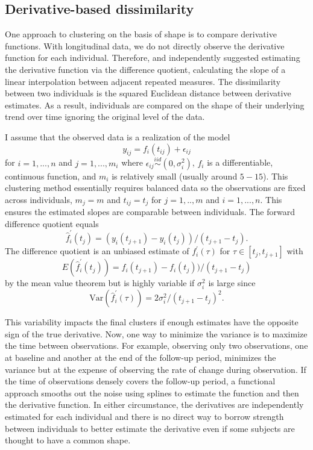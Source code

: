 \subsection{Derivative-based dissimilarity}
One approach to clustering on the basis of shape is to compare derivative functions. With longitudinal data, we do not directly observe the derivative function for each individual. Therefore, \textcite{moller2003} and \textcite{d2000} independently suggested estimating the derivative function via the difference quotient, calculating the slope of a linear interpolation between adjacent repeated measures. The dissimilarity between two individuals is the squared Euclidean distance between derivative estimates. As a result, individuals are compared on the shape of their underlying trend over time ignoring the original level of the data. 

I assume that the observed data is a realization of the model
$$y_{ij}= f_i(t_{ij})+\epsilon_{ij}$$
for $i=1,...,n$ and $j=1,...,m_{i}$ where $\epsilon_{ij}\overset{iid}{\sim} (0,\sigma_{i}^{2})$, $f_{i}$ is a differentiable, continuous function, and $m_{i}$ is relatively small (usually around $5-15$). This clustering method essentially requires balanced data so the observations are fixed across individuals, $m_{j}=m$ and $t_{ij} = t_{j}$ for $j=1,..,m$ and $i=1,...,n$. This ensures the estimated slopes are comparable between individuals. The forward difference quotient equals 
$$\hat{f}_{i}^{'}(t_{j}) = (y_i(t_{j+1})-y_i(t_j))/(t_{j+1}-t_j).$$
The difference quotient is an unbiased estimate of $f_{i}^{'}(\tau)$ for $\tau\in[t_{j},t_{j+1}]$ with
$$E(\hat{f}_{i}^{'}(t_{j})) = f_i(t_{j+1})-f_i(t_j))/(t_{j+1}-t_j)$$
by the mean value theorem but is highly variable if $\sigma_{i}^{2}$ is large since
$$\text{Var}(\hat{f}_{i}^{'}(\tau)) =  2\sigma^{2}_{i}/ (t_{j+1}-t_j)^{2}.$$

This variability impacts the final clusters if enough estimates have the opposite sign of the true derivative. Now, one way to minimize the variance is to maximize the time between observations. For example, observing only two observations, one at baseline and another at the end of the follow-up period, minimizes the variance but at the expense of observing the rate of change during observation. If the time of observations densely covers the follow-up period, a functional approach smooths out the noise using splines to estimate the function and then the derivative function. In either circumstance, the derivatives are independently estimated for each individual and there is no direct way to borrow strength between individuals to better estimate the derivative even if some subjects are thought to have a common shape. 

